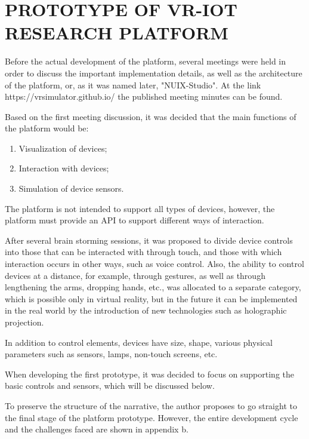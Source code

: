 
\chapter{PROTOTYPE OF VR-IOT RESEARCH PLATFORM}

Before the actual development of the platform, several meetings were held in order to discuss the important implementation details, as well as the architecture of the platform, or, as it was named later, "NUIX-Studio". At the link https://vrsimulator.github.io/ the published meeting minutes can be found. 

Based on the first meeting discussion, it was decided that the main functions of the platform would be:
\begin{enumerate}
     \item Visualization of devices;
     \item Interaction with devices;
     \item Simulation of device sensors.
\end{enumerate}

The platform is not intended to support all types of devices, however, the platform must provide an API to support different ways of interaction.

After several brain storming sessions, it was proposed to divide device controls into those that can be interacted with through touch, and those with which interaction occurs in other ways, such as voice control. Also, the ability to control devices at a distance, for example, through gestures, as well as through lengthening the arms, dropping hands, etc., was allocated to a separate category, which is possible only in virtual reality, but in the future it can be implemented in the real world by the introduction of new technologies such as holographic projection.

In addition to control elements, devices have size, shape, various physical parameters such as sensors, lamps, non-touch screens, etc.

When developing the first prototype, it was decided to focus on supporting the basic controls and sensors, which will be discussed below.

To preserve the structure of the narrative, the author proposes to go straight to the final stage of the platform prototype. However, the entire development cycle and the challenges faced are shown in appendix b.

